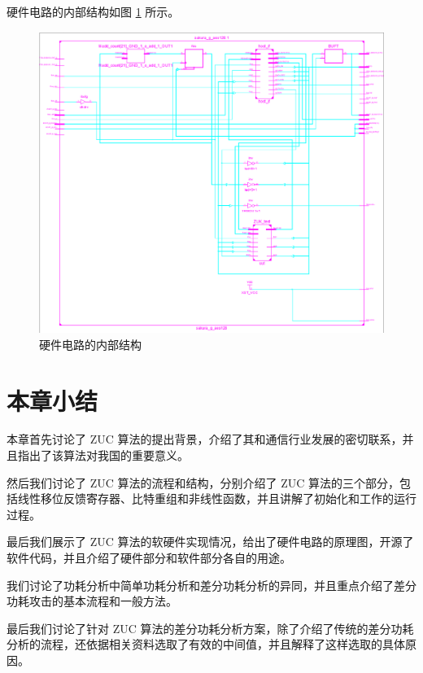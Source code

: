 \newpage

硬件电路的内部结构如图 \ref{fig:circuit_more} 所示。

\begin{figure}[htbp]
    \centering
    \includegraphics[height=.6\textheight]{../images/circuit_more.png}
    \caption{硬件电路的内部结构}
    \label{fig:circuit_more}
\end{figure}

\newpage


\section{本章小结}

本章首先讨论了 ZUC 算法的提出背景，介绍了其和通信行业发展的密切联系，并且指出了该算法对我国的重要意义。

然后我们讨论了 ZUC 算法的流程和结构，分别介绍了 ZUC 算法的三个部分，包括线性移位反馈寄存器、比特重组和非线性函数，并且讲解了初始化和工作的运行过程。

最后我们展示了 ZUC 算法的软硬件实现情况，给出了硬件电路的原理图，开源了软件代码，并且介绍了硬件部分和软件部分各自的用途。

我们讨论了功耗分析中简单功耗分析和差分功耗分析的异同，并且重点介绍了差分功耗攻击的基本流程和一般方法。

最后我们讨论了针对 ZUC 算法的差分功耗分析方案，除了介绍了传统的差分功耗分析的流程，还依据相关资料选取了有效的中间值，并且解释了这样选取的具体原因。
